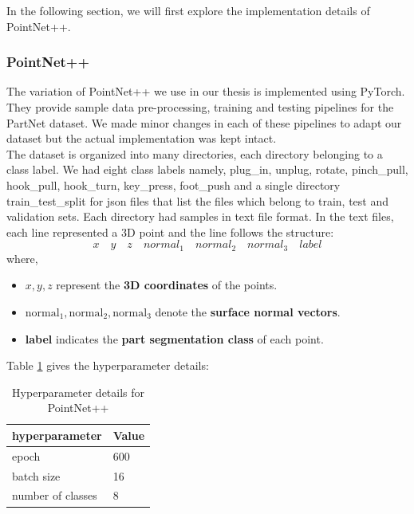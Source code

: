 In the following section, we will first explore the implementation details of PointNet++.

\subsubsection{PointNet++} 
The variation of PointNet++ we use in our thesis is implemented using PyTorch. They provide sample data pre-processing, training and 
testing pipelines for the PartNet dataset. We made minor changes in each of these pipelines to adapt our dataset but the actual implementation
was kept intact. \\
The dataset is organized into many directories, each directory belonging to a class label. We had eight class labels namely,
plug\_in, unplug, rotate, pinch\_pull, hook\_pull, hook\_turn, key\_press, foot\_push and a single directory train\_test\_split for 
json files that list the files which belong to train, test and validation sets.
Each directory had samples in text file format. In the text files, each line represented a 3D point and the line 
follows the structure: 
\begin{equation*}
  x \quad y \quad z \quad normal_1 \quad normal_2 \quad normal_3 \quad label
  \end{equation*}
  where, 
  \begin{itemize}
    \item \( x, y, z \) represent the \textbf{3D coordinates} of the points.
    \item \( \text{normal}_1, \text{normal}_2, \text{normal}_3 \) denote the \textbf{surface normal vectors}.
    \item \textbf{label} indicates the \textbf{part segmentation class} of each point.
  \end{itemize}
Table \ref{tab:PointNet} gives the hyperparameter details:
\begin{longtable}{l|l}
  \caption{Hyperparameter details for PointNet++ } \label{tab:PointNet} \\
  \hline \multicolumn{1}{|c|}{\textbf{hyperparameter}} & \multicolumn{1}{c|}{\textbf{Value}} \\ \hline
  epoch & 600 \\
  batch size & 16 \\
  number of classes & 8 \\
  \hline
\end{longtable}

